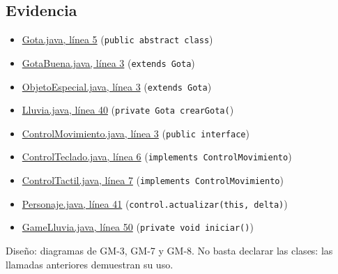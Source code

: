 \subsection*{Evidencia}
\begin{itemize}
\item \href{https://github.com/maverick1006/Proyecto-Game-LLuvia-/blob/entrega-final/core/src/main/java/puppy/code/Gota.java#L5}{Gota.java, línea 5} (\texttt{public abstract class})
\item \href{https://github.com/maverick1006/Proyecto-Game-LLuvia-/blob/entrega-final/core/src/main/java/puppy/code/GotaBuena.java#L3}{GotaBuena.java, línea 3} (\texttt{extends Gota})
\item \href{https://github.com/maverick1006/Proyecto-Game-LLuvia-/blob/entrega-final/core/src/main/java/puppy/code/ObjetoEspecial.java#L3}{ObjetoEspecial.java, línea 3} (\texttt{extends Gota})
\item \href{https://github.com/maverick1006/Proyecto-Game-LLuvia-/blob/entrega-final/core/src/main/java/puppy/code/Lluvia.java#L40}{Lluvia.java, línea 40} (\texttt{private Gota crearGota(})
\item \href{https://github.com/maverick1006/Proyecto-Game-LLuvia-/blob/entrega-final/core/src/main/java/puppy/code/ControlMovimiento.java#L3}{ControlMovimiento.java, línea 3} (\texttt{public interface})
\item \href{https://github.com/maverick1006/Proyecto-Game-LLuvia-/blob/entrega-final/core/src/main/java/puppy/code/ControlTeclado.java#L6}{ControlTeclado.java, línea 6} (\texttt{implements ControlMovimiento})
\item \href{https://github.com/maverick1006/Proyecto-Game-LLuvia-/blob/entrega-final/core/src/main/java/puppy/code/ControlTactil.java#L7}{ControlTactil.java, línea 7} (\texttt{implements ControlMovimiento})
\item \href{https://github.com/maverick1006/Proyecto-Game-LLuvia-/blob/entrega-final/core/src/main/java/puppy/code/Personaje.java#L41}{Personaje.java, línea 41} (\texttt{control.actualizar(this, delta)})
\item \href{https://github.com/maverick1006/Proyecto-Game-LLuvia-/blob/entrega-final/core/src/main/java/puppy/code/GameLluvia.java#L50}{GameLluvia.java, línea 50} (\texttt{private void iniciar()})
\end{itemize}

Diseño: diagramas de GM-3, GM-7 y GM-8. No basta declarar las clases: las llamadas anteriores demuestran su uso.

